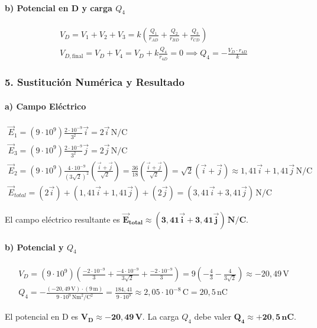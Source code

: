 \paragraph*{b) Potencial en D y carga $Q_4$}
\begin{gather}
    V_D = V_1 + V_2 + V_3 = k\left(\frac{Q_1}{r_{AD}} + \frac{Q_2}{r_{BD}} + \frac{Q_3}{r_{CD}}\right) \\
    V_{D, \text{final}} = V_D + V_4 = V_D + k\frac{Q_4}{r_{4D}} = 0 \implies Q_4 = -\frac{V_D \cdot r_{4D}}{k}
\end{gather}

\subsubsection*{5. Sustitución Numérica y Resultado}
\paragraph*{a) Campo Eléctrico}
\begin{gather}
    \vec{E}_1 = (9\cdot10^9) \frac{2\cdot10^{-9}}{3^2}\vec{i} = 2\vec{i}\,\text{N/C} \\
    \vec{E}_3 = (9\cdot10^9) \frac{2\cdot10^{-9}}{3^2}\vec{j} = 2\vec{j}\,\text{N/C} \\
    \vec{E}_2 = (9\cdot10^9) \frac{4\cdot10^{-9}}{(3\sqrt{2})^2} \left(\frac{\vec{i}+\vec{j}}{\sqrt{2}}\right) = \frac{36}{18} \left(\frac{\vec{i}+\vec{j}}{\sqrt{2}}\right) = \sqrt{2}(\vec{i}+\vec{j}) \approx 1,41\vec{i} + 1,41\vec{j}\,\text{N/C} \\
    \vec{E}_{total} = (2\vec{i}) + (1,41\vec{i} + 1,41\vec{j}) + (2\vec{j}) = (3,41\vec{i} + 3,41\vec{j})\,\text{N/C}
\end{gather}
\begin{cajaresultado}
El campo eléctrico resultante es $\boldsymbol{\vec{E}_{total} \approx (3,41\vec{i} + 3,41\vec{j})\,\textbf{N/C}}$.
\end{cajaresultado}
\paragraph*{b) Potencial y $Q_4$}
\begin{gather}
    V_D = (9\cdot10^9)\left(\frac{-2\cdot10^{-9}}{3} + \frac{-4\cdot10^{-9}}{3\sqrt{2}} + \frac{-2\cdot10^{-9}}{3}\right) = 9\left(-\frac{4}{3} - \frac{4}{3\sqrt{2}}\right) \approx -20,49\,\text{V} \\
    Q_4 = -\frac{(-20,49\,\text{V}) \cdot (9\,\text{m})}{9\cdot10^9\,\text{Nm}^2/\text{C}^2} = \frac{184,41}{9\cdot10^9} \approx 2,05 \cdot 10^{-8}\,\text{C} = 20,5\,\text{nC}
\end{gather}
\begin{cajaresultado}
El potencial en D es $\boldsymbol{V_D \approx -20,49\,\textbf{V}}$. La carga $Q_4$ debe valer $\boldsymbol{Q_4 \approx +20,5\,\textbf{nC}}$.
\end{cajaresultado}

